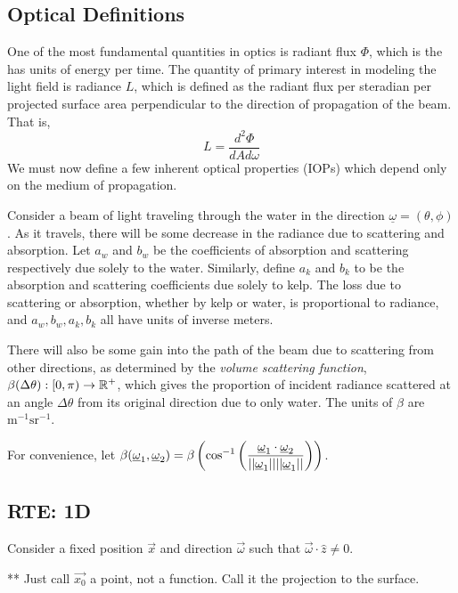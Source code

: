 \subsection{Optical Definitions}
One of the most fundamental quantities in optics is radiant flux $\Phi$, which is the has units of energy per time.
The quantity of primary interest in modeling the light field is radiance $L$, which is defined as the radiant flux per steradian per projected surface area perpendicular to the direction of propagation of the beam.
That is,
\begin{equation}
	L = \frac{d^2\Phi}{dA d\omega}
\end{equation}
We must now define a few inherent optical properties (IOPs) which depend only on the medium of propagation.

Consider a beam of light traveling through the water in the direction $\underline{\omega} = (\theta,\phi)$.
As it travels, there will be some decrease in the radiance due to scattering and absorption.
Let $a_w$ and $b_w$ be the coefficients of absorption and scattering respectively due solely to the water.
Similarly, define $a_k$ and $b_k$ to be the absorption and scattering coefficients due solely to kelp.
The loss due to scattering or absorption, whether by kelp or water, is proportional to radiance, and $a_w,b_w,a_k,b_k$ all have units of inverse meters.

There will also be some gain into the path of the beam due to scattering from other directions, as determined by the \textit{volume scattering function},
$\displaystyle \beta(\Delta\theta): [0,\pi) \rightarrow \mathbb{R}^+$, which gives the proportion of incident radiance scattered at an angle $\Delta\theta$ from its original direction due to only water.
The units of $\beta$ are $\mbox{m}^{-1}\mbox{sr}^{-1}$.

For convenience, let $\displaystyle \beta(\underline{\omega}_1,\underline{\omega}_2) = \beta\left(\cos^{-1}\left(\frac{\underline{\omega}_1\cdot\underline{\omega}_2}{||\underline{\omega}_1||||\underline{\omega}_1||}\right)\right)$. 

\subsection{RTE: 1D}
Consider a fixed position $\vec{x}$ and direction $\vec{\omega}$ such that
$\vec{\omega} \cdot \hat{z} \neq 0$.

** Just call $\vec{x_0}$ a point, not a function. Call it the projection to the surface.

